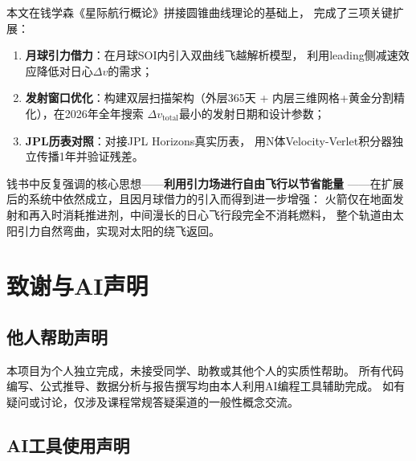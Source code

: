 \documentclass[UTF8,12pt,a4paper]{ctexart}
\begin{document}
本文在钱学森《星际航行概论》拼接圆锥曲线理论的基础上，
完成了三项关键扩展：

\begin{enumerate}[label=(\arabic*)]
    \item \textbf{月球引力借力}：在月球SOI内引入双曲线飞越解析模型，
          利用leading侧减速效应降低对日心$\Delta v$的需求；
    \item \textbf{发射窗口优化}：构建双层扫描架构（外层365天 +
          内层三维网格+黄金分割精化），在2026年全年搜索
          $\Delta v_{\text{total}}$最小的发射日期和设计参数；
    \item \textbf{JPL历表对照}：对接JPL Horizons真实历表，
          用N体Velocity-Verlet积分器独立传播1年并验证残差。
\end{enumerate}

钱书中反复强调的核心思想——\textbf{利用引力场进行自由飞行以节省能量}
——在扩展后的系统中依然成立，且因月球借力的引入而得到进一步增强：
火箭仅在地面发射和再入时消耗推进剂，中间漫长的日心飞行段完全不消耗燃料，
整个轨道由太阳引力自然弯曲，实现对太阳的绕飞返回。

\section{致谢与AI声明}

\subsection*{他人帮助声明}

本项目为个人独立完成，未接受同学、助教或其他个人的实质性帮助。
所有代码编写、公式推导、数据分析与报告撰写均由本人利用AI编程工具辅助完成。
如有疑问或讨论，仅涉及课程常规答疑渠道的一般性概念交流。

\subsection*{AI工具使用声明}
\end{document}
